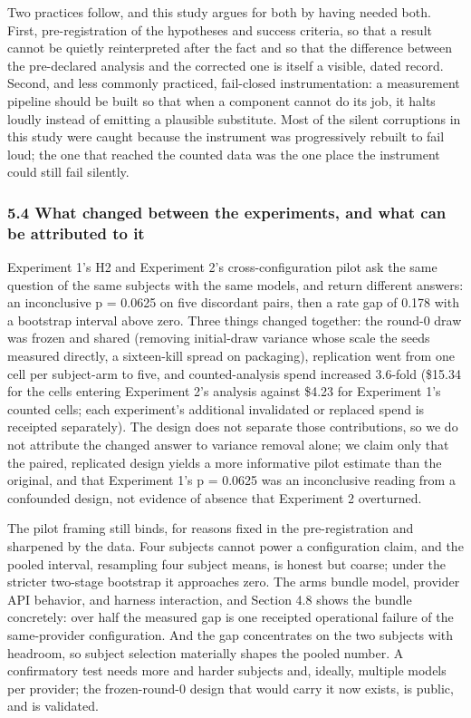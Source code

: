 \documentclass[
  11pt,
]{article}
\begin{document}
Two practices follow, and this study argues for both by having needed
both. First, pre-registration of the hypotheses and success criteria, so
that a result cannot be quietly reinterpreted after the fact and so that
the difference between the pre-declared analysis and the corrected one
is itself a visible, dated record. Second, and less commonly practiced,
fail-closed instrumentation: a measurement pipeline should be built so
that when a component cannot do its job, it halts loudly instead of
emitting a plausible substitute. Most of the silent corruptions in this
study were caught because the instrument was progressively rebuilt to
fail loud; the one that reached the counted data was the one place the
instrument could still fail silently.

\subsubsection{5.4 What changed between the experiments, and what can be
attributed to
it}\label{what-changed-between-the-experiments-and-what-can-be-attributed-to-it}

Experiment 1's H2 and Experiment 2's cross-configuration pilot ask the
same question of the same subjects with the same models, and return
different answers: an inconclusive p = 0.0625 on five discordant pairs,
then a rate gap of 0.178 with a bootstrap interval above zero. Three
things changed together: the round-0 draw was frozen and shared
(removing initial-draw variance whose scale the seeds measured directly,
a sixteen-kill spread on packaging), replication went from one cell per
subject-arm to five, and counted-analysis spend increased 3.6-fold
(\$15.34 for the cells entering Experiment 2's analysis against \$4.23
for Experiment 1's counted cells; each experiment's additional
invalidated or replaced spend is receipted separately). The design does
not separate those contributions, so we do not attribute the changed
answer to variance removal alone; we claim only that the paired,
replicated design yields a more informative pilot estimate than the
original, and that Experiment 1's p = 0.0625 was an inconclusive reading
from a confounded design, not evidence of absence that Experiment 2
overturned.

The pilot framing still binds, for reasons fixed in the pre-registration
and sharpened by the data. Four subjects cannot power a configuration
claim, and the pooled interval, resampling four subject means, is honest
but coarse; under the stricter two-stage bootstrap it approaches zero.
The arms bundle model, provider API behavior, and harness interaction,
and Section 4.8 shows the bundle concretely: over half the measured gap
is one receipted operational failure of the same-provider configuration.
And the gap concentrates on the two subjects with headroom, so subject
selection materially shapes the pooled number. A confirmatory test needs
more and harder subjects and, ideally, multiple models per provider; the
frozen-round-0 design that would carry it now exists, is public, and is
validated.
\end{document}

